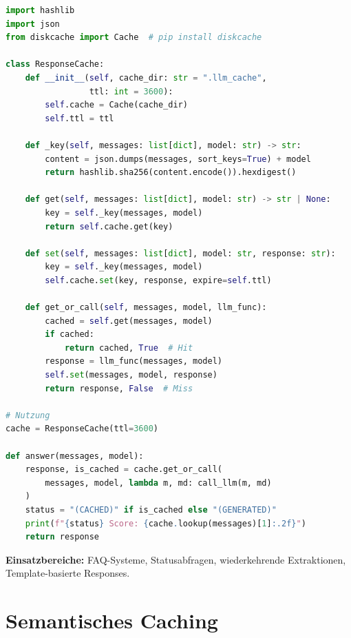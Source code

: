 \begin{lstlisting}[language=Python, caption=Response Cache mit Hash-Key]
import hashlib
import json
from diskcache import Cache  # pip install diskcache

class ResponseCache:
    def __init__(self, cache_dir: str = ".llm_cache",
                 ttl: int = 3600):
        self.cache = Cache(cache_dir)
        self.ttl = ttl

    def _key(self, messages: list[dict], model: str) -> str:
        content = json.dumps(messages, sort_keys=True) + model
        return hashlib.sha256(content.encode()).hexdigest()

    def get(self, messages: list[dict], model: str) -> str | None:
        key = self._key(messages, model)
        return self.cache.get(key)

    def set(self, messages: list[dict], model: str, response: str):
        key = self._key(messages, model)
        self.cache.set(key, response, expire=self.ttl)

    def get_or_call(self, messages, model, llm_func):
        cached = self.get(messages, model)
        if cached:
            return cached, True  # Hit
        response = llm_func(messages, model)
        self.set(messages, model, response)
        return response, False  # Miss

# Nutzung
cache = ResponseCache(ttl=3600)

def answer(messages, model):
    response, is_cached = cache.get_or_call(
        messages, model, lambda m, md: call_llm(m, md)
    )
    status = "(CACHED)" if is_cached else "(GENERATED)"
    print(f"{status} Score: {cache.lookup(messages)[1]:.2f}")
    return response
\end{lstlisting}

\textbf{Einsatzbereiche:} FAQ-Systeme, Statusabfragen, wiederkehrende Extraktionen, Template-basierte Responses.


\section{Semantisches Caching}

